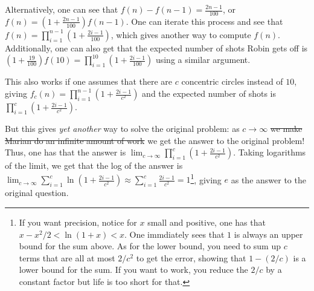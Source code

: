 \documentclass[11pt]{article}
\theoremstyle{definition}
\begin{document}
Alternatively, one can see that $\displaystyle{f(n) - f(n-1) = \frac{2n-1}{100}}$, or $\displaystyle{f(n) = \left(1+\frac{2n-1}{100}\right)f(n-1)}$.  One can iterate this process and see that $f(n) = \displaystyle{\prod_{i=1}^{n-1}\left(1+\frac{2i-1}{100}\right)}$, which gives another way to compute $f(n)$.  Additionally, one can also get that the expected number of shots Robin gets off is $\displaystyle{\left(1+\frac{19}{100}\right)f(10) = \prod_{i = 1}^{10}\left(1 + \frac{2i-1}{100}\right)}$ using a similar argument.

This also works if one assumes that there are $c$ concentric circles instead of $10$, giving $f_c(n) = \displaystyle{\prod_{i = 1}^{n-1} \left(1+\frac{2i-1}{c^2}\right)}$ and the expected number of shots is $\displaystyle{\prod_{i=1}^{c}\left(1+\frac{2i-1}{c^2}\right)}$.

But this gives \emph{yet another} way to solve the original problem: as $c\rightarrow \infty$ \sout{we make Marian do an infinite amount of work} we get the answer to the original problem!  Thus, one has that the answer is $\displaystyle{\lim_{c\rightarrow \infty}\prod_{i = 1}^{c}\left(1 + \frac{2i-1}{c^2}\right)}$.  Taking logarithms of the limit, we get that the log of the answer is $\displaystyle{\lim_{c\rightarrow\infty} \sum_{i=1}^{c}\ln\left(1+ \frac{2i-1}{c^2}\right) \approx \sum_{i=1}^{c} \frac{2i-1}{c^2} = 1}$\footnote{If you want precision, notice for $x$ small and positive, one has that $x-x^2/2 < \ln(1+x) < x$.  One immdiately sees that $1$ is always an upper bound for the sum above.  As for the lower bound, you need to sum up $c$ terms that are all at most $2/c^2$ to get the error, showing that $1-(2/c)$ is a lower bound for the sum.  If you want to work, you reduce the $2/c$ by a constant factor but life is too short for that.}, giving $e$ as the answer to the original question.
\end{document}
